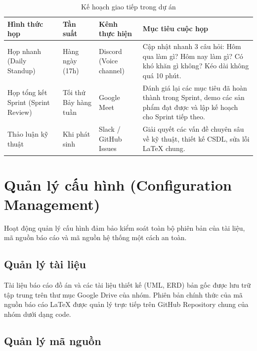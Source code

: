 \begin{table}[H]
\centering
\renewcommand{\arraystretch}{1.3}
\begin{tabularx}{\textwidth}{|>{\raggedright\arraybackslash}p{3cm}|>{\raggedright\arraybackslash}p{2cm}|>{\raggedright\arraybackslash}p{3cm}|>{\raggedright\arraybackslash}X|}
\hline
\rowcolor{tableheader}
\textbf{Hình thức họp} & \textbf{Tần suất} & \textbf{Kênh thực hiện} & \textbf{Mục tiêu cuộc họp} \\ \hline
Họp nhanh (Daily Standup) & Hàng ngày (17h) & Discord (Voice channel) & Cập nhật nhanh 3 câu hỏi: Hôm qua làm gì? Hôm nay làm gì? Có khó khăn gì không? Kéo dài không quá 10 phút. \\ \hline
Họp tổng kết Sprint (Sprint Review) & Tối thứ Bảy hàng tuần & Google Meet & Đánh giá lại các mục tiêu đã hoàn thành trong Sprint, demo các sản phẩm đạt được và lập kế hoạch cho Sprint tiếp theo. \\ \hline
Thảo luận kỹ thuật & Khi phát sinh & Slack / GitHub Issues & Giải quyết các vấn đề chuyên sâu về kỹ thuật, thiết kế CSDL, sửa lỗi LaTeX chung. \\ \hline
\end{tabularx}
\caption{Kế hoạch giao tiếp trong dự án}
\label{tab:spmp_communications}
\end{table}

\section{Quản lý cấu hình (Configuration Management)}
\label{sec:spmp_configuration}

Hoạt động quản lý cấu hình đảm bảo kiểm soát toàn bộ phiên bản của tài liệu, mã nguồn báo cáo và mã nguồn hệ thống một cách an toàn.

\subsection{Quản lý tài liệu}
\label{subsec:spmp_doc_mgmt}

Tài liệu báo cáo đồ án và các tài liệu thiết kế (UML, ERD) bản gốc được lưu trữ tập trung trên thư mục Google Drive của nhóm. Phiên bản chính thức của mã nguồn báo cáo LaTeX được quản lý trực tiếp trên GitHub Repository chung của nhóm dưới dạng code.

\subsection{Quản lý mã nguồn}
\label{subsec:spmp_code_mgmt}

